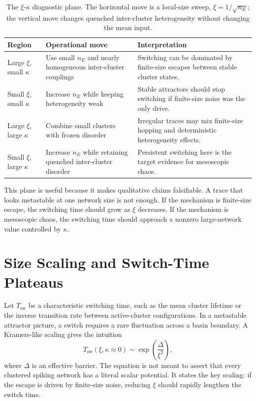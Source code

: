 \begin{table}[t]
\centering
\small
\begin{tabularx}{\textwidth}{@{}p{}p{}X@{}}
\toprule
\textbf{Region} & \textbf{Operational move} & \textbf{Interpretation} \\
\midrule
Large \(\xi\), small \(\kappa\) & Use small \(n_E\) and nearly homogeneous inter-cluster couplings & Switching can be dominated by finite-size escapes between stable cluster states. \\
Small \(\xi\), small \(\kappa\) & Increase \(n_E\) while keeping heterogeneity weak & Stable attractors should stop switching if finite-size noise was the only drive. \\
Large \(\xi\), large \(\kappa\) & Combine small clusters with frozen disorder & Irregular traces may mix finite-size hopping and deterministic heterogeneity effects. \\
Small \(\xi\), large \(\kappa\) & Increase \(n_E\) while retaining quenched inter-cluster disorder & Persistent switching here is the target evidence for mesoscopic chaos. \\
\bottomrule
\end{tabularx}
\caption{The \(\xi\)-\(\kappa\) diagnostic plane. The horizontal move is a
local-size sweep, \(\xi=1/\sqrt{n_E}\); the vertical move changes quenched
inter-cluster heterogeneity without changing the mean input.}
\label{tab:ch09-xi-kappa-plane}
\end{table}

This plane is useful because it makes qualitative claims falsifiable. A trace
that looks metastable at one network size is not enough. If the mechanism is
finite-size escape, the switching time should grow as \(\xi\) decreases. If the
mechanism is mesoscopic chaos, the switching time should approach a nonzero
large-network value controlled by \(\kappa\).

\section{Size Scaling and Switch-Time Plateaus}
\label{sec:ch09-switch-time-plateaus}

Let \(T_{\mathrm{sw}}\) be a characteristic switching time, such as the mean
cluster lifetime or the inverse transition rate between active-cluster
configurations. In a metastable attractor picture, a switch requires a rare
fluctuation across a basin boundary. A Kramers-like scaling gives the intuition
\begin{equation}
    T_{\mathrm{sw}}(\xi,\kappa\approx 0)
    \sim
    \exp\!\left(\frac{\Delta}{\xi^2}\right),
    \label{eq:ch09-kramers-scaling}
\end{equation}
where \(\Delta\) is an effective barrier. The equation is not meant to assert
that every clustered spiking network has a literal scalar potential. It states
the key scaling: if the escape is driven by finite-size noise, reducing
\(\xi\) should rapidly lengthen the switch time.

